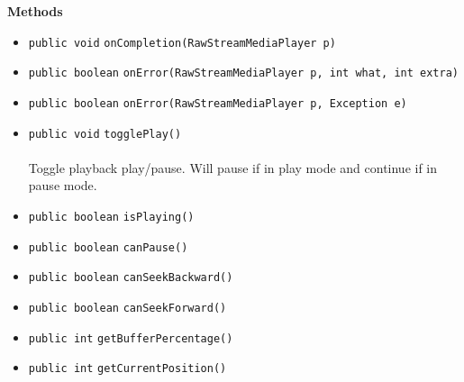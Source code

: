 \textbf{\sffamily Methods}
\begin{itemize}
\item \lstinline|public void| \lstinline|onCompletion|\lstinline|(RawStreamMediaPlayer p)| \\[-0.6em]




\item \lstinline|public boolean| \lstinline|onError|\lstinline|(RawStreamMediaPlayer p, int what, int extra)| \\[-0.6em]




\item \lstinline|public boolean| \lstinline|onError|\lstinline|(RawStreamMediaPlayer p, Exception e)| \\[-0.6em]




\item \lstinline|public void| \lstinline|togglePlay|\lstinline|()|\\ \\[-0.6em]
Toggle playback play/pause. Will pause if in play mode and continue if
 in pause mode.



\item \lstinline|public boolean| \lstinline|isPlaying|\lstinline|()| \\[-0.6em]




\item \lstinline|public boolean| \lstinline|canPause|\lstinline|()| \\[-0.6em]




\item \lstinline|public boolean| \lstinline|canSeekBackward|\lstinline|()| \\[-0.6em]




\item \lstinline|public boolean| \lstinline|canSeekForward|\lstinline|()| \\[-0.6em]




\item \lstinline|public int| \lstinline|getBufferPercentage|\lstinline|()| \\[-0.6em]




\item \lstinline|public int| \lstinline|getCurrentPosition|\lstinline|()| \\[-0.6em]





\end{itemize}
